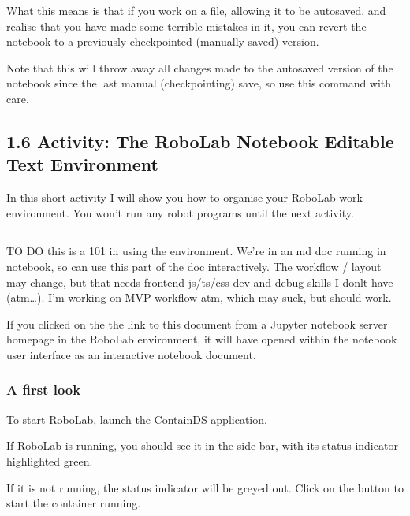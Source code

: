 \documentclass[letterpaper,10pt,english]{sphinxmanual}
\let\sphinxpxdimen\pdfpxdimen\else\newdimen\sphinxpxdimen
\begin{document}
What this means is that if you work on a file, allowing it to be autosaved, and realise that you have made some terrible mistakes in it, you can revert the notebook to a previously checkpointed (manually saved) version.

Note that this will throw away all changes made to the autosaved version of the notebook since the last manual (checkpointing) save, so use this command with care.


\subsection{1.6 Activity: The RoboLab Notebook Editable Text Environment}
\label{\detokenize{content/00_READ_ME_FIRST/Section_00_06_RoboLab_Environment:1.6-Activity:-The-RoboLab-Notebook-Editable-Text-Environment}}\label{\detokenize{content/00_READ_ME_FIRST/Section_00_06_RoboLab_Environment::doc}}
In this short activity I will show you how to organise your RoboLab work environment. You won’t run any robot programs until the next activity.


\bigskip\hrule\bigskip




TO DO \sphinxhyphen{} this is a 101 in using the environment. We’re in an md doc running in notebook, so can use this part of the doc interactively. The workflow / layout may change, but that needs front\sphinxhyphen{}end js/ts/css dev and debug skills I donlt have (atm…). I’m working on MVP workflow atm, which may suck, but should work.



If you clicked on the the link to this document from a Jupyter notebook server homepage in the RoboLab environment, it will have opened within the notebook user interface as an interactive notebook document.


\subsubsection{A first look}
\label{\detokenize{content/00_READ_ME_FIRST/Section_00_06_RoboLab_Environment:A-first-look}}
To start RoboLab, launch the ContainDS application.

If RoboLab is running, you should see it in the side bar, with its status indicator highlighted green.

\sphinxincludegraphics[width=2150\sphinxpxdimen,height=980\sphinxpxdimen]{{00_01_ContainDS_robolab_running}.png}

If it is not running, the status indicator will be greyed out. Click on the  button to start the container running.
\end{document}
